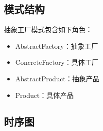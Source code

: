 \documentclass[letterpaper,10pt,english]{sphinxmanual}
\begin{document}
\subsection{模式结构}
\label{\detokenize{creational_patterns/abstract_factory:id4}}
\sphinxAtStartPar
抽象工厂模式包含如下角色：
\begin{itemize}
\item {} 
\sphinxAtStartPar
AbstractFactory：抽象工厂

\item {} 
\sphinxAtStartPar
ConcreteFactory：具体工厂

\item {} 
\sphinxAtStartPar
AbstractProduct：抽象产品

\item {} 
\sphinxAtStartPar
Product：具体产品

\end{itemize}

\noindent{}


\subsection{时序图}
\label{\detokenize{creational_patterns/abstract_factory:id5}}
\noindent{}
\end{document}
